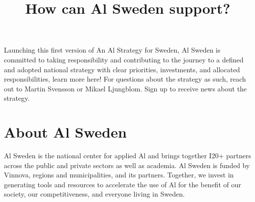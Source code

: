 \title{
How can Al Sweden support?
}
Launching this first version of An Al Strategy for Sweden, Al Sweden is committed to taking responsibility and contributing to the journey to a defined and adopted national strategy with clear priorities, investments, and allocated responsibilities, learn more here!
For questions about the strategy as such, reach out to Martin Svensson or Mikael Ljungblom.
Sign up to receive news about the strategy.
\section*{About Al Sweden}
Al Sweden is the national center for applied Al and brings together I20+ partners across the public and private sectors as well as academia. Al Sweden is funded by Vinnova, regions and municipalities, and its partners. Together, we invest in generating tools and resources to accelerate the use of Al for the benefit of our society, our competitiveness, and everyone living in Sweden.
